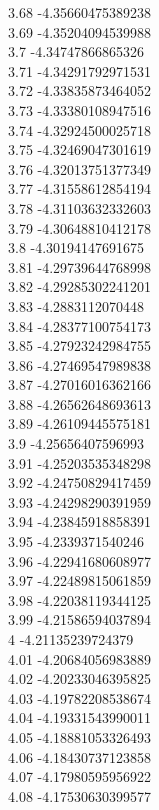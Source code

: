 {3.68	-4.35660475389238\\
3.69	-4.35204094539988\\
3.7	-4.34747866865326\\
3.71	-4.34291792971531\\
3.72	-4.33835873464052\\
3.73	-4.33380108947516\\
3.74	-4.32924500025718\\
3.75	-4.32469047301619\\
3.76	-4.32013751377349\\
3.77	-4.31558612854194\\
3.78	-4.31103632332603\\
3.79	-4.30648810412178\\
3.8	-4.30194147691675\\
3.81	-4.29739644768998\\
3.82	-4.29285302241201\\
3.83	-4.2883112070448\\
3.84	-4.28377100754173\\
3.85	-4.27923242984755\\
3.86	-4.27469547989838\\
3.87	-4.27016016362166\\
3.88	-4.26562648693613\\
3.89	-4.26109445575181\\
3.9	-4.25656407596993\\
3.91	-4.25203535348298\\
3.92	-4.24750829417459\\
3.93	-4.24298290391959\\
3.94	-4.23845918858391\\
3.95	-4.2339371540246\\
3.96	-4.22941680608977\\
3.97	-4.22489815061859\\
3.98	-4.22038119344125\\
3.99	-4.21586594037894\\
4	-4.21135239724379\\
4.01	-4.20684056983889\\
4.02	-4.20233046395825\\
4.03	-4.19782208538674\\
4.04	-4.19331543990011\\
4.05	-4.18881053326493\\
4.06	-4.18430737123858\\
4.07	-4.17980595956922\\
4.08	-4.17530630399577\\
}
